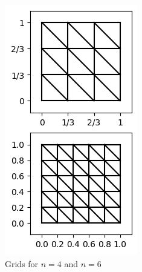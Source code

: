 \documentclass[11pt,a4paper]{article}
\begin{document}
\begin{figure}
  \centering
  \begin{subfigure}{.2\textwidth}
    \centering
    \includegraphics[width=1\linewidth]{structured_grids}
    \caption{Grids for $n=4$ and $n=6$}
  \end{subfigure}%
  \begin{subfigure}{.8\textwidth}

\end{subfigure}
\end{figure}
\end{document}
